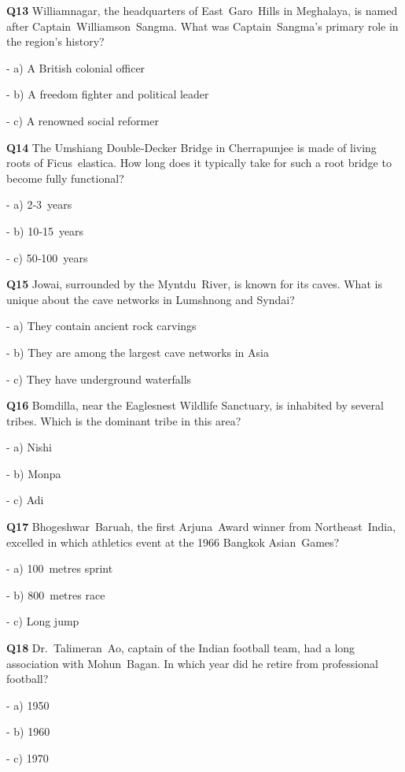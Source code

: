 \textbf{Q13} Williamnagar, the headquarters of East Garo Hills in Meghalaya, is named after Captain Williamson Sangma. What was Captain Sangma's primary role in the region's history?\par
\quad - a) A British colonial officer\par
\quad - b) A freedom fighter and political leader\par
\quad - c) A renowned social reformer\par

\textbf{Q14} The Umshiang Double‑Decker Bridge in Cherrapunjee is made of living roots of Ficus elastica. How long does it typically take for such a root bridge to become fully functional?\par
\quad - a) 2‑3 years\par
\quad - b) 10‑15 years\par
\quad - c) 50‑100 years\par

\textbf{Q15} Jowai, surrounded by the Myntdu River, is known for its caves. What is unique about the cave networks in Lumshnong and Syndai?\par
\quad - a) They contain ancient rock carvings\par
\quad - b) They are among the largest cave networks in Asia\par
\quad - c) They have underground waterfalls\par

\textbf{Q16} Bomdilla, near the Eaglesnest Wildlife Sanctuary, is inhabited by several tribes. Which is the dominant tribe in this area?\par
\quad - a) Nishi\par
\quad - b) Monpa\par
\quad - c) Adi\par

\textbf{Q17} Bhogeshwar Baruah, the first Arjuna Award winner from Northeast India, excelled in which athletics event at the 1966 Bangkok Asian Games?\par
\quad - a) 100 metres sprint\par
\quad - b) 800 metres race\par
\quad - c) Long jump\par

\textbf{Q18} Dr. Talimeran Ao, captain of the Indian football team, had a long association with Mohun Bagan. In which year did he retire from professional football?\par
\quad - a) 1950\par
\quad - b) 1960\par
\quad - c) 1970\par

